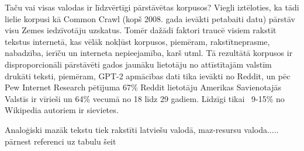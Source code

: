 
Taču vai visas valodas ir līdzvērtīgi pārstāvētas korpusos? Viegli iztēloties, ka tādi lielie korpusi kā Common Crawl (kopš 2008. gada ievākti petabaiti datu) pārstāv visu Zemes iedzīvotāju uzskatus. Tomēr dažādi faktori traucē visiem rakstīt tekstus internetā, kas vēlāk nokļūst korpusos, piemēram, rakstītneprasme, nabadzība, ierīču un interneta nepieejamība, karš utml. Tā rezultātā korpusos ir disproporcionāli pārstāvēti gados jaunāku lietotāju no attīstītajām valstīm drukāti teksti, piemēram, GPT-2 apmācības dati tika ievākti no Reddit, un pēc Pew Internet Research pētījuma 67\% Reddit lietotāju Amerikas Savienotajās Valstīs ir vīrieši un 64\% vecumā no 18 līdz 29 gadiem. Līdzīgi tikai ~9-15\% no Wikipedia autoriem ir sievietes\cite{bender2021}.


Analoģiski mazāk tekstu tiek rakstīti latviešu valodā, maz-resursu valoda..... pārnest referenci uz tabulu šeit